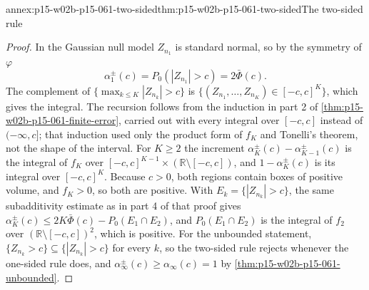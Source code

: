 \begin{annexitem}{annex:p15-w02b-p15-061-two-sided}{thm:p15-w02b-p15-061-two-sided}{The two-sided rule}
\begin{proof}
In the Gaussian null model \(Z_{n_1}\) is standard normal, so by the
symmetry of \(\varphi\)
\[
 \alpha^{\pm}_1(c)=P_0(|Z_{n_1}|>c)=2\bar\Phi(c).
\] The complement of \(\{\max_{k\leq K}|Z_{n_k}|>c\}\) is
\(\{(Z_{n_1},\ldots,Z_{n_K})\in[-c,c]^K\}\), which gives the integral.
The recursion follows from the induction in part 2 of
\cref{thm:p15-w02b-p15-061-finite-error}, carried out with every
integral over \([-c,c]\) instead of \((-\infty,c]\); that induction used
only the product form of \(f_K\) and Tonelli's theorem, not the shape of
the interval. For \(K\geq2\) the increment
\(\alpha^{\pm}_K(c)-\alpha^{\pm}_{K-1}(c)\) is the integral of \(f_K\)
over \([-c,c]^{K-1}\times(\mathbb R\setminus[-c,c])\), and
\(1-\alpha^{\pm}_K(c)\) is its integral over \([-c,c]^K\). Because
\(c>0\), both regions contain boxes of positive volume, and \(f_K>0\), so
both are positive. With \(E_k=\{|Z_{n_k}|>c\}\), the same subadditivity
estimate as in part 4 of that proof gives
\(\alpha^{\pm}_K(c)\leq2K\bar\Phi(c)-P_0(E_1\cap E_2)\), and
\(P_0(E_1\cap E_2)\) is the integral of \(f_2\) over
\((\mathbb R\setminus[-c,c])^2\), which is positive. For the unbounded
statement, \(\{Z_{n_k}>c\}\subseteq\{|Z_{n_k}|>c\}\) for every \(k\), so
the two-sided rule rejects whenever the one-sided rule does, and
\(\alpha^{\pm}_\infty(c)\geq\alpha_\infty(c)=1\) by
\cref{thm:p15-w02b-p15-061-unbounded}.
\end{proof}
\end{annexitem}

